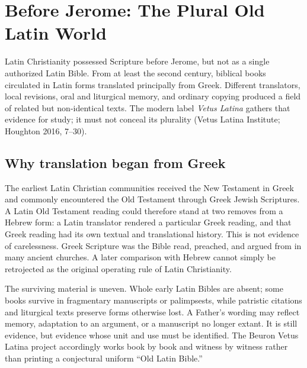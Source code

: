 \section{Before Jerome: The Plural Old Latin World}

Latin Christianity possessed Scripture before Jerome, but not as a single authorized Latin Bible. From at least the second century, biblical books circulated in Latin forms translated principally from Greek. Different translators, local revisions, oral and liturgical memory, and ordinary copying produced a field of related but non-identical texts. The modern label \emph{Vetus Latina} gathers that evidence for study; it must not conceal its plurality (Vetus Latina Institute; Houghton 2016, 7--30).

\subsection{Why translation began from Greek}

The earliest Latin Christian communities received the New Testament in Greek and commonly encountered the Old Testament through Greek Jewish Scriptures. A Latin Old Testament reading could therefore stand at two removes from a Hebrew form: a Latin translator rendered a particular Greek reading, and that Greek reading had its own textual and translational history. This is not evidence of carelessness. Greek Scripture was the Bible read, preached, and argued from in many ancient churches. A later comparison with Hebrew cannot simply be retrojected as the original operating rule of Latin Christianity.

The surviving material is uneven. Whole early Latin Bibles are absent; some books survive in fragmentary manuscripts or palimpsests, while patristic citations and liturgical texts preserve forms otherwise lost. A Father's wording may reflect memory, adaptation to an argument, or a manuscript no longer extant. It is still evidence, but evidence whose unit and use must be identified. The Beuron Vetus Latina project accordingly works book by book and witness by witness rather than printing a conjectural uniform ``Old Latin Bible.''


